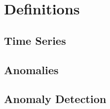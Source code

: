 \section{Definitions}
\blindtext[1]

\subsection{Time Series}
\blindtext[2]

\subsection{Anomalies}
\blindtext[2]

\subsection{Anomaly Detection}
\blindtext[2]


